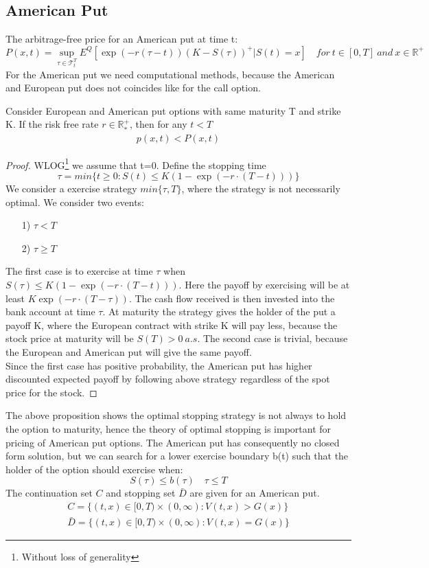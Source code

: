 \subsection{American Put}\label{americanPut}
The arbitrage-free price for an American put at time t:
\begin{equation}\label{AmericanPutPrice}
P(x,t)=\sup_{\tau \in \mathcal{T}_t^T} E^Q[\exp(-r(\tau-t)) (K-S(\tau))^+|S(t)=x] \quad for \ t\in [0,T] \ and \ x\in\mathbb{R}^+
\end{equation}
For the American put we need computational methods, because the American and European put does not coincides like for the call option.

\begin{proposition}{}
Consider European and American put options with same maturity T and strike K. If the risk free rate $r\in \mathbb{R}_*^+$, then for any $t<T$
\begin{equation}
\begin{split}
p(x,t)<P(x,t)
\end{split}
\end{equation}
\begin{proof}
WLOG\footnote{Without loss of generality} we assume that t=0. Define the stopping time
$$\tau = min \{t\geq 0 : S(t) \leq K(1-\exp(-r\cdot (T-t)))\}$$
We consider a exercise strategy $min\{\tau, T\}$, where the strategy is not necessarily optimal. We consider two events:
\begin{enumerate}
\item[1)] $\tau<T$
\item[2)] $\tau \geq T$
\end{enumerate}
The first case is to exercise at time $\tau$ when $S(\tau) \leq K(1-\exp(-r\cdot (T-t)))$. Here the payoff by exercising will be at least $K\exp(-r\cdot (T-\tau))$. The cash flow received is then invested into the bank account at time $\tau$. At maturity the strategy gives the holder of the put a payoff K, where the European contract with strike K will pay less, because the stock price at maturity will be $S(T)>0 \ a.s.$
The second case is trivial, because the European and American put will give the same payoff. \\
Since the first case has positive probability, the American put has higher discounted expected payoff by following above strategy regardless of the spot price for the stock. 
\end{proof}
\end{proposition}
The above proposition shows the optimal stopping strategy is not always to hold the option to maturity, hence the theory of optimal stopping is important for pricing of American put options. The American put has consequently no closed form solution, but we can search for a lower exercise boundary b(t) such that the holder of the option should exercise when:
$$S(\tau)\leq b(\tau) \quad \tau \leq T$$
The continuation set $C$ and stopping set $\bar{D}$ are given for an American put.
\begin{align*}
C=\{(t,x) \in [0,T) \times (0,\infty) : V(t,x) > G(x) \}\\
\bar{D}=\{(t,x) \in [0,T) \times (0,\infty) : V(t,x) = G(x) \}
\end{align*} 

